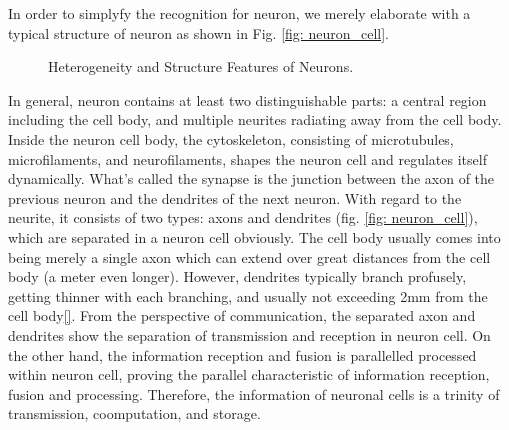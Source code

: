 \documentclass[journal,comsoc]{IEEEtran}
\begin{document}
				In order to simplyfy the recognition for neuron, we merely elaborate with a typical structure of neuron as shown in Fig. \ref{fig: neuron_cell}.
				\begin{figure}[htbp]
					\centering
					\caption{Heterogeneity and Structure Features of Neurons.}
				\end{figure}
				
				In general, neuron contains  at least two distinguishable parts: 
				a central region including the cell body, and multiple neurites radiating away from the cell body. 
				Inside the neuron cell body, the cytoskeleton, consisting of microtubules, microfilaments, and neurofilaments, shapes the neuron cell and regulates itself dynamically. 
				What's called the synapse is the junction between the axon of the previous neuron and the dendrites of the next neuron.
				With regard to the neurite, it consists of two types: axons and dendrites (fig. \ref{fig: neuron_cell}), which are separated in a neuron cell obviously.
				The cell body usually comes into being merely a single axon which can extend over great distances from the cell body (a meter even longer).
				However, dendrites typically branch profusely, getting thinner with each branching, and usually not exceeding 2mm from the cell body\ref{}.
				From the perspective of communication, the separated axon and dendrites show the separation of transmission and reception in neuron cell. 
				On the other hand, the information reception and fusion is parallelled processed within neuron cell, proving the parallel characteristic of information reception, fusion and processing.
				Therefore, the information of neuronal cells is a trinity of transmission, coomputation, and storage.
				
\end{document}
